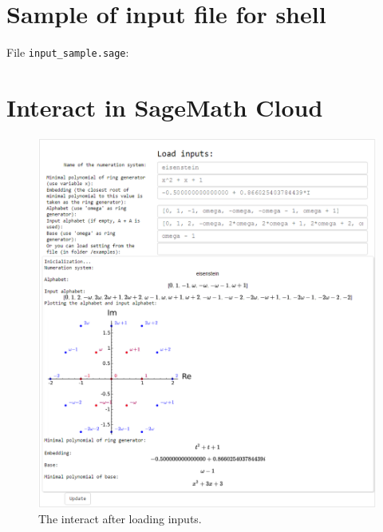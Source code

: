 \newpage
\section{Sample of input file for shell}
File \verb+input_sample.sage+:
\label{app:inputSample}



\section{Interact in SageMath Cloud}
\label{app:interact}
\begin{figure}[!htbp]
  \centering
  \includegraphics[width=\textwidth]{img/interact1.png}
  \caption{The interact after loading inputs.}
  \label{fig:interact1}
\end{figure}

